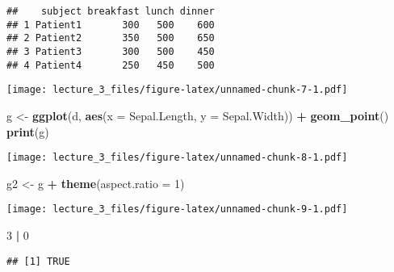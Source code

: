 \documentclass[]{article}
\newenvironment{Shaded}{\begin{snugshade}}{\end{snugshade}}
\newcommand{\DataTypeTok}[1]{\textcolor[rgb]{0.13,0.29,0.53}{#1}}
\newcommand{\DecValTok}[1]{\textcolor[rgb]{0.00,0.00,0.81}{#1}}
\newcommand{\KeywordTok}[1]{\textcolor[rgb]{0.13,0.29,0.53}{\textbf{#1}}}
\newcommand{\NormalTok}[1]{#1}
\newcommand{\OperatorTok}[1]{\textcolor[rgb]{0.81,0.36,0.00}{\textbf{#1}}}
\newcommand{\StringTok}[1]{\textcolor[rgb]{0.31,0.60,0.02}{#1}}
\begin{document}
\begin{verbatim}
##    subject breakfast lunch dinner
## 1 Patient1       300   500    600
## 2 Patient2       350   500    650
## 3 Patient3       300   500    450
## 4 Patient4       250   450    500
\end{verbatim}

\begin{Shaded}
\end{Shaded}

\texttt{[image: lecture\_3\_files/figure-latex/unnamed-chunk-7-1.pdf]}

\begin{Shaded}
\begin{Highlighting}[]
\NormalTok{g <-}\StringTok{ }\KeywordTok{ggplot}\NormalTok{(d, }\KeywordTok{aes}\NormalTok{(}\DataTypeTok{x =}\NormalTok{ Sepal.Length, }\DataTypeTok{y =}\NormalTok{ Sepal.Width)) }\OperatorTok{+}
\StringTok{  }\KeywordTok{geom_point}\NormalTok{()}
\KeywordTok{print}\NormalTok{(g)}
\end{Highlighting}
\end{Shaded}

\texttt{[image: lecture\_3\_files/figure-latex/unnamed-chunk-8-1.pdf]}

\begin{Shaded}
\begin{Highlighting}[]
\NormalTok{g2 <-}\StringTok{ }\NormalTok{g }\OperatorTok{+}\StringTok{ }\KeywordTok{theme}\NormalTok{(}\DataTypeTok{aspect.ratio =} \DecValTok{1}\NormalTok{)}
\end{Highlighting}
\end{Shaded}

\begin{Shaded}
\end{Shaded}

\texttt{[image: lecture\_3\_files/figure-latex/unnamed-chunk-9-1.pdf]}

\begin{Shaded}
\begin{Highlighting}[]
\DecValTok{3} \OperatorTok{|}\StringTok{ }\DecValTok{0}
\end{Highlighting}
\end{Shaded}

\begin{verbatim}
## [1] TRUE
\end{verbatim}
\end{document}
